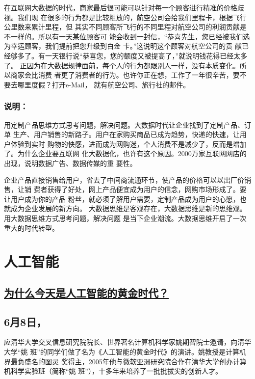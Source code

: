\documentclass[11pt]{ctexart}
\begin{document}
{{{{在互联网大数据的时代，商家最后很可能可以针对每一个顾客进行精准的价格歧视。我们现
在很多的行为都是比较粗放的，航空公司会给我们里程卡，根据飞行公里数来累计里程，但
其实不同顾客所飞行的不同里程对航空公司的利润贡献是不一样的。所以有一天某位顾客可
能会收到一封信，“恭喜先生，您已经被我们选为幸运顾客，我们提前把您升级到白金
卡。”这说明这个顾客对航空公司的贡
献已经够多了。有一天银行说“恭喜您，您的额度又被提高了，”就说明钱花得已经太多了。
正因为在大数据规律面前，每个人的行为都跟别人一样，没有本质变化。所以商家会比消费
者更了消费者的行为。也许你正在想，工作了一年很辛苦，要不要去哪里度假？打开e-Mail，
就有航空公司、旅行社的邮件。

\subsubsection{说明：}
\label{sec:org9f280a6}
用定制产品思维方式思考问题，解决问题。大数据时代让企业找到了定制产品、订单
生产、用户销售的新路子。用户在家购买商品已成为趋势，快递的快速，让用户体验到实时
购物的快感，进而成为网购迷，个人消费不是减少了，反而是增加了。为什么企业要互联网
化大数据化，也许有这个原因。2000万家互联网网店的出现，说明数据广告、数据传媒的重
要性。

企业产品直接销售给用户，省去了中间商流通环节，使产品的价格可以以出厂价销售，让销
费者获得了好处，网上产品便宜成为用户的信念，网购市场形成了。要让用户成为你的产品
粉丝，就必须了解用户需要，定制产品成为用户的心愿，也就成为企业发展的新方向。
大数据思维是客观存在，大数据思维是新的思维观。用大数据思维方式思考问题，解决问题
是当下企业潮流。大数据思维开启了一次重大的时代转型。



\section{人工智能}
\label{sec:org99cc734}
\subsection{\href{http://blog.sina.com.cn/s/blog\_475b3d560102wizo.html}{为什么今天是人工智能的黄金时代？}}
\label{sec:org4b38b90}
\subsection{6月8日，}
\label{sec:org9065bb4}
应清华大学交叉信息研究院院长、世界著名计算机科学家姚期智院士邀请，向清华大学“姚
班”的同学们做了名为《人工智能的黄金时代》的演讲。姚教授是计算机界最负盛名的图灵
奖得主，2005年他与微软亚洲研究院合作在清华大学创办计算机科学实验班（简称“姚
班”），十多年来培养了一批批拔尖的创新人才。
}}}}
\end{document}
